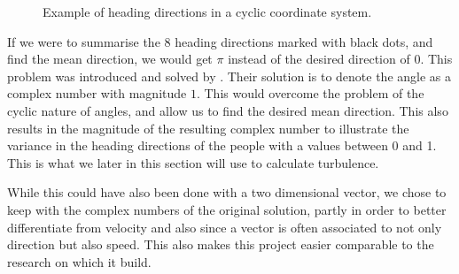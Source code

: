 \begin{figure}[htbp]
\centering
{}
\caption{Example of heading directions in a cyclic coordinate system.}
\label{fig:radiansHeadingdirection}
\end{figure}

If we were to summarise the 8 heading directions marked with black dots, and find the mean direction, we would get $\pi$ instead of the desired direction of $0$. This problem was introduced and solved by \citet{localTrendStatistics}. Their solution is to denote the angle as a complex number with magnitude $1$. This would overcome the problem of the cyclic nature of angles, and allow us to find the desired mean direction. This also results in the magnitude of the resulting complex number to illustrate the variance in the heading directions of the people with a values between 0 and 1. This is what we later in this section will use to calculate turbulence. 

While this could have also been done with a two dimensional vector, we chose to keep with the complex numbers of the original solution, partly in order to better differentiate from velocity and also since a vector is often associated to not only direction but also speed. This also makes this project easier comparable to the research on which it build.


